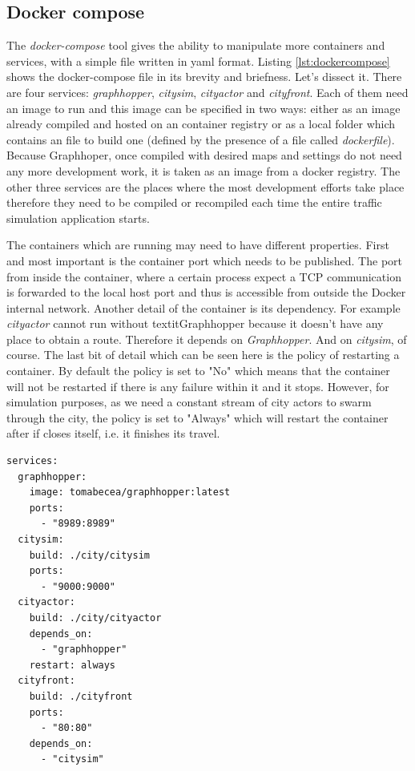 \documentclass[conference]{IEEEtran}
\begin{document}
\subsection{Docker compose}

The \textit{docker-compose} tool gives the ability to manipulate more containers and services, with a simple file written in yaml format. Listing \ref{lst:dockercompose} shows the docker-compose file in its brevity and briefness. Let's dissect it. There are four services: \textit{graphhopper}, \textit{citysim}, \textit{cityactor} and \textit{cityfront}. Each of them need an image to run and this image can be specified in two ways: either as an image already compiled and hosted on an container registry or as a local folder which contains an file to build one (defined by the presence of a file called \textit{dockerfile}). Because Graphhoper, once compiled with desired maps and settings do not need any more development work, it is taken as an image from a docker registry. The other three services are the places where the most development efforts take place therefore they need to be compiled or recompiled each time the entire traffic simulation application starts.

The containers which are running may need to have different properties. First and most important is the container port which needs to be published. The port from inside the container, where a certain process expect a TCP communication is forwarded to the local host port and thus is accessible from outside the Docker internal network. Another detail of the container is its dependency. For example \textit{cityactor} cannot run without textit{Graphhopper} because it doesn't have any place to obtain a route. Therefore it depends on \textit{Graphhopper}. And on \textit{citysim}, of course. The last bit of detail which can be seen here is the policy of restarting a container. By default the policy is set to "No" which means that the container will not be restarted if there is any failure within it and it stops. However, for simulation purposes, as we need a constant stream of city actors to swarm through the city, the policy is set to "Always" which will restart the container after if closes itself, i.e. it finishes its travel.

\begin{lstlisting}[caption=Docker-compose file, label=lst:dockercompose]
services:
  graphhopper:
    image: tomabecea/graphhopper:latest
    ports:
      - "8989:8989"
  citysim:
    build: ./city/citysim
    ports:
      - "9000:9000"
  cityactor:
    build: ./city/cityactor
    depends_on: 
      - "graphhopper"
    restart: always
  cityfront:
    build: ./cityfront
    ports:
      - "80:80"
    depends_on:
      - "citysim"
\end{lstlisting}
\end{document}
